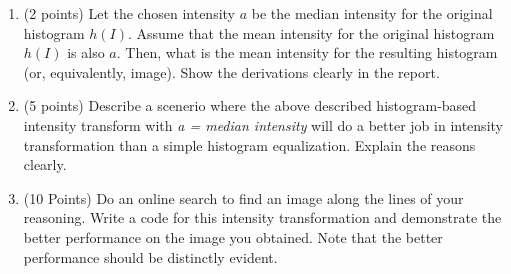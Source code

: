 \documentclass[11pt]{article}
\begin{document}
\begin {enumerate}
\begin {enumerate}
  
  
\item (2 points) Let the chosen intensity $a$ be the median intensity for the original histogram $h(I)$. Assume that the mean intensity for the
  original histogram $h(I)$ is also $a$. Then, what is the mean intensity for the resulting histogram (or, equivalently, image). Show the derivations clearly in the report.

  
\item (5 points) Describe a scenerio where the above described histogram-based intensity transform with \emph{a = median intensity} will do a better job in intensity transformation than a simple histogram equalization. Explain the reasons clearly. 


\item (10 Points) Do an online search to find an image along the lines of your reasoning. Write a code for this intensity transformation and demonstrate the better performance on the image you obtained. Note that the better performance should be distinctly evident.

  
  
 \end {enumerate}

\end {enumerate}
\end{document}
